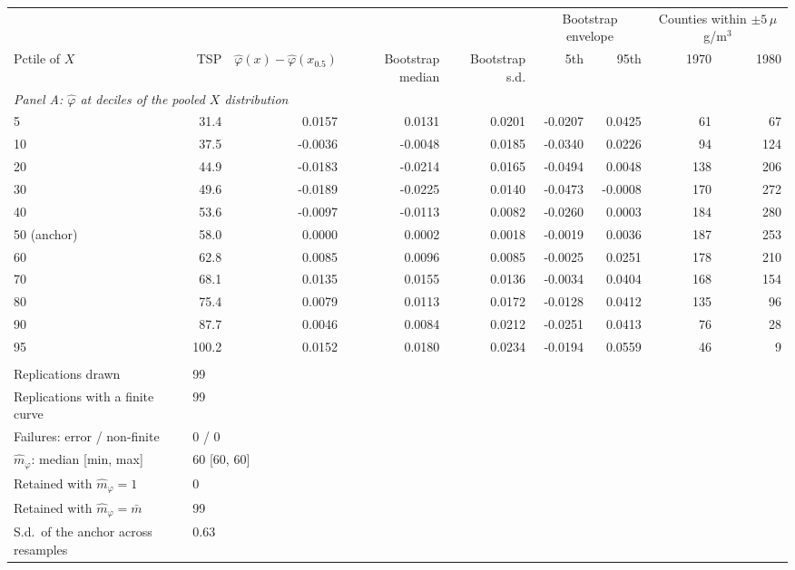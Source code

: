 \begin{tabular}{lrrrrrrrr}
\toprule
& & & & & \multicolumn{2}{c}{Bootstrap envelope} & \multicolumn{2}{c}{Counties within $\pm5\,\mu$g/m$^3$} \\
\cmidrule(lr){6-7} \cmidrule(lr){8-9}
Pctile of $X$ & TSP & $\hat\varphi(x)-\hat\varphi(x_{0.5})$ & Bootstrap median & Bootstrap s.d. & 5th & 95th & 1970 & 1980 \\
\midrule
\multicolumn{9}{l}{\textit{Panel A: $\hat\varphi$ at deciles of the pooled $X$ distribution}} \\
\midrule
5 & 31.4 & 0.0157 & 0.0131 & 0.0201 & -0.0207 & 0.0425 & 61 & 67 \\
10 & 37.5 & -0.0036 & -0.0048 & 0.0185 & -0.0340 & 0.0226 & 94 & 124 \\
20 & 44.9 & -0.0183 & -0.0214 & 0.0165 & -0.0494 & 0.0048 & 138 & 206 \\
30 & 49.6 & -0.0189 & -0.0225 & 0.0140 & -0.0473 & -0.0008 & 170 & 272 \\
40 & 53.6 & -0.0097 & -0.0113 & 0.0082 & -0.0260 & 0.0003 & 184 & 280 \\
50 (anchor) & 58.0 & 0.0000 & 0.0002 & 0.0018 & -0.0019 & 0.0036 & 187 & 253 \\
60 & 62.8 & 0.0085 & 0.0096 & 0.0085 & -0.0025 & 0.0251 & 178 & 210 \\
70 & 68.1 & 0.0135 & 0.0155 & 0.0136 & -0.0034 & 0.0404 & 168 & 154 \\
80 & 75.4 & 0.0079 & 0.0113 & 0.0172 & -0.0128 & 0.0412 & 135 & 96 \\
90 & 87.7 & 0.0046 & 0.0084 & 0.0212 & -0.0251 & 0.0413 & 76 & 28 \\
95 & 100.2 & 0.0152 & 0.0180 & 0.0234 & -0.0194 & 0.0559 & 46 & 9 \\
\addlinespace
\multicolumn{9}{l}{\textit{Panel B: bootstrap design and convergence}} \\
\midrule
Replications drawn & \multicolumn{8}{l}{99} \\
Replications with a finite curve & \multicolumn{8}{l}{99} \\
Failures: error / non-finite & \multicolumn{8}{l}{0 / 0} \\
$\hat m_\varphi$: median [min, max] & \multicolumn{8}{l}{60 [60, 60]} \\
Retained with $\hat m_\varphi = 1$ & \multicolumn{8}{l}{0} \\
Retained with $\hat m_\varphi = \bar m$ & \multicolumn{8}{l}{99} \\
S.d.\ of the anchor across resamples & \multicolumn{8}{l}{0.63} \\

\end{tabular}
